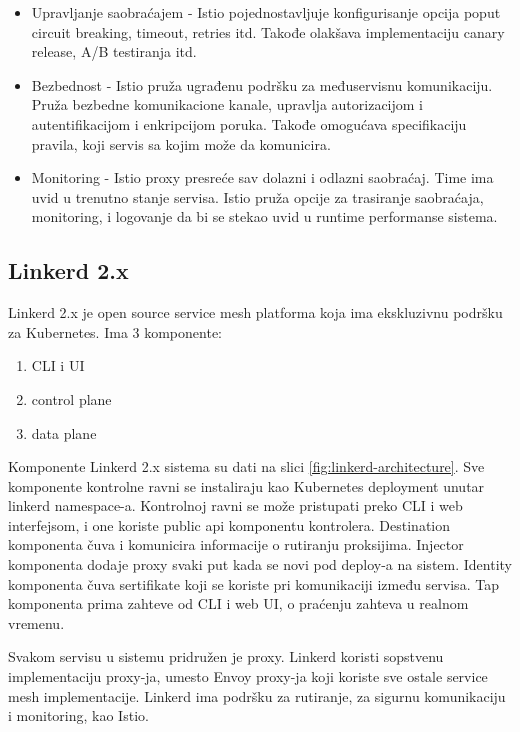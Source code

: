 \documentclass[a4paper,12pt]{report}
\begin{document}
\begin{itemize}
	\item Upravljanje saobraćajem - Istio pojednostavljuje konfigurisanje opcija poput circuit breaking, timeout, retries itd. Takođe olakšava implementaciju canary release, A/B testiranja itd. 
	\item Bezbednost - Istio pruža ugrađenu podršku za međuservisnu komunikaciju. Pruža bezbedne komunikacione kanale, upravlja autorizacijom i autentifikacijom i enkripcijom poruka. Takođe omogućava specifikaciju pravila, koji servis sa kojim može da komunicira. 
	\item Monitoring - Istio proxy presreće sav dolazni i odlazni saobraćaj. Time ima uvid u trenutno stanje servisa. Istio pruža opcije za trasiranje saobraćaja, monitoring, i logovanje da bi se stekao uvid u runtime performanse sistema. 
\end{itemize}

\subsection{Linkerd 2.x}

Linkerd 2.x je open source service mesh platforma koja ima ekskluzivnu podršku za Kubernetes. Ima 3 komponente:

\begin{enumerate}
	\item CLI i UI
	\item  control plane
	\item  data plane
\end{enumerate}

Komponente Linkerd 2.x sistema su dati na slici \ref{fig:linkerd-architecture}. Sve komponente kontrolne ravni se instaliraju kao Kubernetes deployment unutar linkerd namespace-a. Kontrolnoj ravni se može pristupati preko CLI i web interfejsom, i one koriste public api komponentu kontrolera. Destination komponenta čuva i komunicira informacije o rutiranju proksijima. Injector komponenta dodaje proxy svaki put kada se novi pod deploy-a na sistem. Identity komponenta čuva sertifikate koji se koriste pri komunikaciji između servisa. Tap komponenta prima zahteve od CLI i web UI, o praćenju zahteva u realnom vremenu.\newline

Svakom servisu u sistemu pridružen je proxy. Linkerd koristi sopstvenu implementaciju proxy-ja, umesto Envoy proxy-ja koji koriste sve ostale service mesh implementacije. Linkerd ima podršku za rutiranje, za sigurnu komunikaciju i monitoring, kao Istio. 
\end{document}
